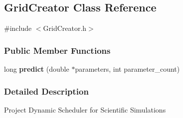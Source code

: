 \hypertarget{a00018}{}\subsection{Grid\+Creator Class Reference}
\label{a00018}


{\ttfamily \#include $<$Grid\+Creator.\+h$>$}

\subsubsection*{Public Member Functions}
\begin{DoxyCompactItemize}
\item 
\hypertarget{a00018_a2a1ef6eaef2cabb482c19ef55d168249}{}long {\bfseries predict} (double $\ast$parameters, int parameter\+\_\+count)\label{a00018_a2a1ef6eaef2cabb482c19ef55d168249}

\end{DoxyCompactItemize}


\subsubsection{Detailed Description}
Project Dynamic Scheduler for Scientific Simulations 